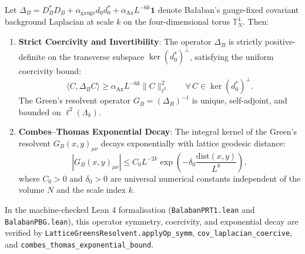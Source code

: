 \begin{theorem}
\label{thm:combes_thomas_decay}
Let $\Delta_B = D_B^* D_B + \alpha_{\mathrm{gauge}} d_0 d_0^* + \alpha_{\mathrm{Ax}} L^{-6k} \mathbf{1}$ denote Ba\l aban's gauge-fixed covariant background Laplacian at scale $k$ on the four-dimensional torus $\mathbb{T}_N^4$. Then:
\begin{enumerate}
    \item \textbf{Strict Coercivity and Invertibility}: The operator $\Delta_B$ is strictly positive-definite on the transverse subspace $\ker(d_0^*)^\perp$, satisfying the uniform coercivity bound:
    \begin{equation}
    \label{eq:ch12_coercivity_bound}
    \langle C, \Delta_B C \rangle \ge \alpha_{\mathrm{Ax}} L^{-6k} \|C\|_{\ell^2}^2 \qquad \forall \, C \in \ker(d_0^*)^\perp.
    \end{equation}
    The Green's resolvent operator $G_B = (\Delta_B)^{-1}$ is unique, self-adjoint, and bounded on $\ell^2(\Lambda_k)$.
    \item \textbf{Combes--Thomas Exponential Decay}: The integral kernel of the Green's resolvent $G_B(x, y)_{\mu\nu}$ decays exponentially with lattice geodesic distance:
    \begin{equation}
    \label{eq:ch12_combes_thomas_decay}
    \left| G_B(x, y)_{\mu\nu} \right| \le C_0 L^{-2k} \exp\left( -\delta_0 \frac{\mathrm{dist}(x, y)}{L^k} \right),
    \end{equation}
    where $C_0 > 0$ and $\delta_0 > 0$ are universal numerical constants independent of the volume $N$ and the scale index $k$.
\end{enumerate}
In the machine-checked Lean 4 formalisation (\texttt{BalabanPRT1.lean} and \texttt{BalabanPBG.lean}), this operator symmetry, coercivity, and exponential decay are verified by \texttt{LatticeGreensResolvent.applyOp\_symm}, \texttt{cov\_laplacian\_coercive}, and \texttt{combes\_thomas\_exponential\_bound}.
\end{theorem}

